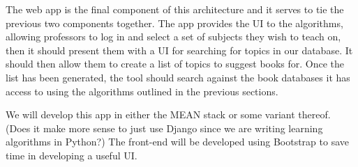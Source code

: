 
The web app is the final component of this architecture and it serves to tie the previous two components together.
The app provides the UI to the algorithms, allowing professors to log in and select a set of subjects they wish to teach on, then it should present them with a UI for searching for topics in our database.  
It should then allow them to create a list of topics to suggest books for.
Once the list has been generated, the tool should search against the book databases it has access to using the algorithms outlined in the previous sections.

We will develop this app in either the MEAN stack or some variant thereof.  (Does it make more sense to just use Django since we are writing learning algorithms in Python?)
The front-end will be developed using Bootstrap to save time in developing a useful UI.